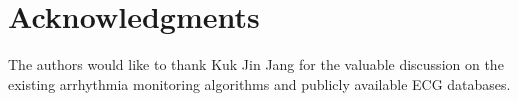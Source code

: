 \section*{Acknowledgments}
\label{sec:ack}
The authors would like to thank Kuk Jin Jang for the valuable 
discussion on the existing arrhythmia monitoring algorithms and 
publicly available ECG databases. 